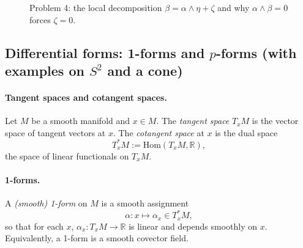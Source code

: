 \documentclass[12pt,a4paper]{article}
\theoremstyle{plain}
\theoremstyle{definition}      %
\begin{document}
\begin{figure}[H]
{%
	}
	\caption{Problem 4: the local decomposition $\beta=\alpha\wedge\eta+\zeta$ and why $\alpha\wedge\beta=0$ forces $\zeta=0$.}
\end{figure}



\subsection*{Differential forms: 1-forms and $p$-forms (with examples on $S^2$ and a cone)}

\paragraph{Tangent spaces and cotangent spaces.}
Let $M$ be a smooth manifold and $x\in M$.
The \emph{tangent space} $T_xM$ is the vector space of tangent vectors at $x$.
The \emph{cotangent space} at $x$ is the dual space
\[
T_x^*M := \mathrm{Hom}(T_xM,\mathbb{R}),
\]
the space of linear functionals on $T_xM$.

\paragraph{1-forms.}
A \emph{(smooth) 1-form} on $M$ is a smooth assignment
\[
\alpha: x \mapsto \alpha_x \in T_x^*M,
\]
so that for each $x$, $\alpha_x: T_xM \to \mathbb{R}$ is linear and depends smoothly on $x$.
Equivalently, a 1-form is a smooth covector field.
\end{document}
